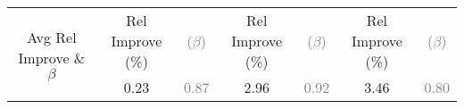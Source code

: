 \begin{table*}[h]
\begin{center}
\begin{small}
{\begin{tabular}{|c|c|c|c|c|c|c|c|c|c|}
\multirow{2}{*}{Avg Rel Improve \& $\beta$} & \multicolumn{2}{c|}{Rel Improve (\%)} & \textcolor{gray}{($\beta$)} & \multicolumn{2}{c|}{Rel Improve (\%)} & \textcolor{gray}{($\beta$)} &
\multicolumn{2}{c|}{Rel Improve (\%)} & \textcolor{gray}{($\beta$)} \\ \cline{2-10} 
                  & \multicolumn{2}{c|}{0.23} 
                  & \textcolor{gray}{0.87}
                  & \multicolumn{2}{c|}{2.96} 
                  & \textcolor{gray}{0.92}
                  & \multicolumn{2}{c|}{3.46} 
                  & \textcolor{gray}{0.80} \\ \hline
\end{tabular}
}
\end{small}
\end{center}
\vskip -0.1in
\end{table*}

